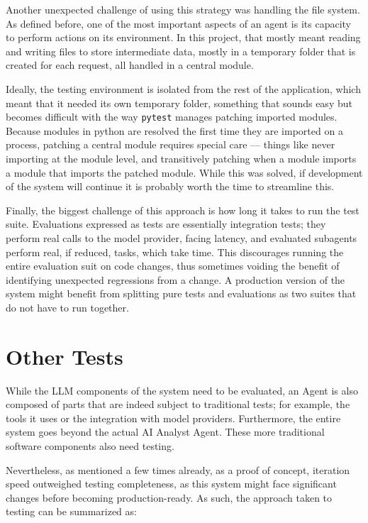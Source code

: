 \documentclass[a4paper]{report}
\begin{document}
Another unexpected challenge of using this strategy was handling the file system. As defined before, one of the most important aspects of an agent is its capacity to perform actions on its environment. In this project, that mostly meant reading and writing files to store intermediate data, mostly in a temporary folder that is created for each request, all handled in a central module.

Ideally, the testing environment is isolated from the rest of the application, which meant that it needed its own temporary folder, something that sounds easy but becomes difficult with the way \texttt{pytest} manages patching imported modules. Because modules in python are resolved the first time they are imported on a process, patching a central module requires special care --- things like never importing at the module level, and transitively patching when a module imports a module that imports the patched module. While this was solved, if development of the system will continue it is probably worth the time to streamline this.

Finally, the biggest challenge of this approach is how long it takes to run the test suite. Evaluations expressed as tests are essentially integration tests; they perform real calls to the model provider, facing latency, and evaluated subagents perform real, if reduced, tasks, which take time. This discourages running the entire evaluation suit on code changes, thus sometimes voiding the benefit of identifying unexpected regressions from a change. A production version of the system might benefit from splitting pure tests and evaluations as two suites that do not have to run together.

\section{Other Tests}
\label{sec:other-tests}

While the LLM components of the system need to be evaluated, an Agent is also composed of parts that are indeed subject to traditional tests; for example, the tools it uses or the integration with model providers. Furthermore, the entire system goes beyond the actual AI Analyst Agent. These more traditional software components also need testing.

Nevertheless, as mentioned a few times already, as a proof of concept, iteration speed outweighed testing completeness, as this system might face significant changes before becoming production-ready. As such, the approach taken to testing can be summarized as:
\end{document}
